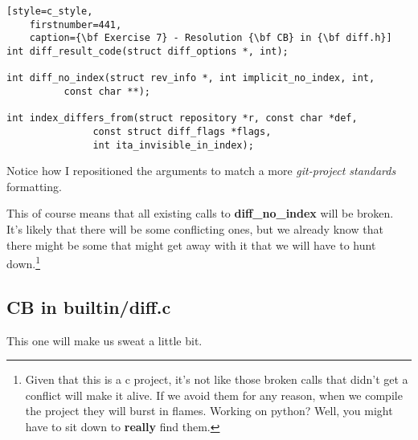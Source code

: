 \begin{lstlisting}[style=c_style,
	firstnumber=441,
	caption={\bf Exercise 7} - Resolution {\bf CB} in {\bf diff.h}]
int diff_result_code(struct diff_options *, int);

int diff_no_index(struct rev_info *, int implicit_no_index, int,
		  const char **);

int index_differs_from(struct repository *r, const char *def,
		       const struct diff_flags *flags,
		       int ita_invisible_in_index);
\end{lstlisting}

Notice how I repositioned the arguments to match a more {\it git-project standards} formatting.

This of course means that all existing calls to {\bf diff\_no\_index} will be broken. It's likely that there will
be some conflicting ones, but we already know that there might be some that might get away with it that we will
have to hunt down.\footnote{Given that this is a c project, it's not like those broken calls that didn't get a conflict
will make it alive. If we avoid them for any reason, when we compile the project they will burst in flames. Working on
python? Well, you might have to sit down to {\bf really} find them.}

\subsection*{CB in builtin/diff.c}

This one will make us sweat a little bit.

